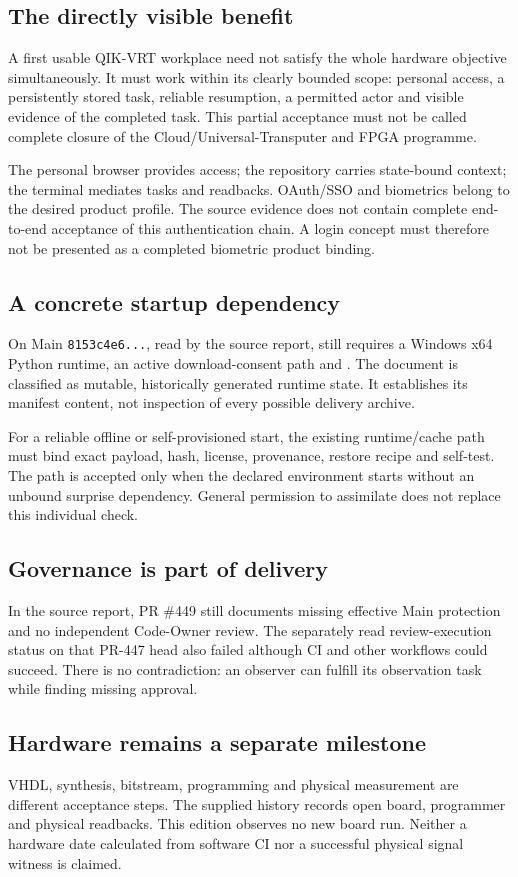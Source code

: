 \begin{cols}
\subsection*{The directly visible benefit}
A first usable QIK-VRT workplace need not satisfy the whole hardware objective simultaneously. It must work within its clearly bounded scope: personal access, a persistently stored task, reliable resumption, a permitted actor and visible evidence of the completed task. This partial acceptance must not be called complete closure of the Cloud/Universal-Transputer and FPGA programme.

The personal browser provides access; the repository carries state-bound context; the terminal mediates tasks and readbacks. OAuth/SSO and biometrics belong to the desired product profile. The source evidence does not contain complete end-to-end acceptance of this authentication chain. A login concept must therefore not be presented as a completed biometric product binding.

\subsection*{A concrete startup dependency}
On Main \texttt{8153c4e6...}, read by the source report,  still requires a Windows x64 Python runtime, an active download-consent path and . The document is classified as mutable, historically generated runtime state. It establishes its manifest content, not inspection of every possible delivery archive. 

For a reliable offline or self-provisioned start, the existing runtime/cache path must bind exact payload, hash, license, provenance, restore recipe and self-test. The path is accepted only when the declared environment starts without an unbound surprise dependency. General permission to assimilate does not replace this individual check.

\subsection*{Governance is part of delivery}
In the source report, PR \#449 still documents missing effective Main protection and no independent Code-Owner review. The separately read review-execution status on that PR-447 head also failed although CI and other workflows could succeed. There is no contradiction: an observer can fulfill its observation task while finding missing approval. 

\subsection*{Hardware remains a separate milestone}
VHDL, synthesis, bitstream, programming and physical measurement are different acceptance steps. The supplied history records open board, programmer and physical readbacks. This edition observes no new board run. Neither a hardware date calculated from software CI nor a successful physical signal witness is claimed. 
\end{cols}

